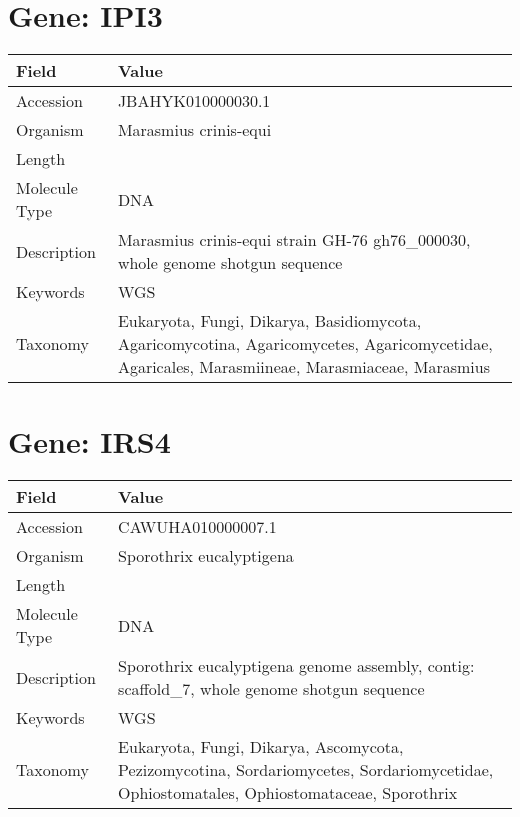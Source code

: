 \documentclass[10pt]{article}
\begin{document}
\section*{Gene: IPI3}
{\footnotesize
\begin{longtable}{>{\raggedright\arraybackslash}p{4.5cm} >{\raggedright\arraybackslash}p{11.5cm}}
\textbf{Field} & \textbf{Value} \\
\hline
Accession & JBAHYK010000030.1 \\
Organism & Marasmius crinis-equi \\
Length & 120529 \\
Molecule Type & DNA \\
Description & Marasmius crinis-equi strain GH-76 gh76\_000030, whole genome shotgun sequence \\
Keywords & WGS \\
Taxonomy & Eukaryota, Fungi, Dikarya, Basidiomycota, Agaricomycotina, Agaricomycetes, Agaricomycetidae, Agaricales, Marasmiineae, Marasmiaceae, Marasmius \\
\end{longtable}
}


\section*{Gene: IRS4}
{\footnotesize
\begin{longtable}{>{\raggedright\arraybackslash}p{4.5cm} >{\raggedright\arraybackslash}p{11.5cm}}
\textbf{Field} & \textbf{Value} \\
\hline
Accession & CAWUHA010000007.1 \\
Organism & Sporothrix eucalyptigena \\
Length & 525197 \\
Molecule Type & DNA \\
Description & Sporothrix eucalyptigena genome assembly, contig: scaffold\_7, whole genome shotgun sequence \\
Keywords & WGS \\
Taxonomy & Eukaryota, Fungi, Dikarya, Ascomycota, Pezizomycotina, Sordariomycetes, Sordariomycetidae, Ophiostomatales, Ophiostomataceae, Sporothrix \\
\end{longtable}
}
\end{document}
